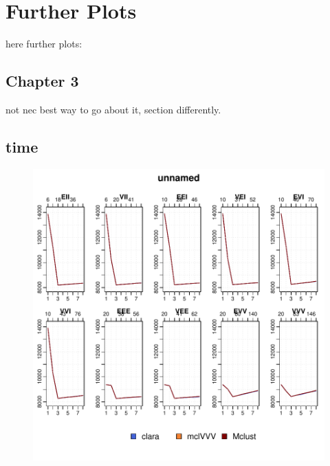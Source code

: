 \chapter{Further Plots}


here further plots:

\section{Chapter 3}
not nec best way to go about it, section differently.

\section{time}
\label{App:time}



\begin{figure}[h]
    \centering
    \begin{minipage}{0.45\textwidth}
\includegraphics{App_plots-fig5fit}
    \end{minipage}
    \begin{minipage}{0.45\textwidth}

\end{minipage}
\end{figure}
